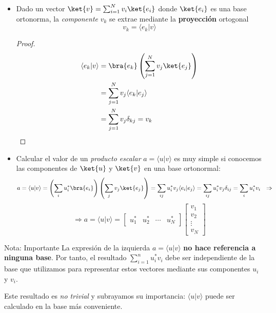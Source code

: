 \documentclass[a4paper,11pt]{book} %
\numberwithin{equation}{chapter}
\newcommand{\braket}[2]{\langle #1|#2\rangle}
\begin{document}
\begin{itemize}
	\item Dado un vector  $\ket{v} = \sum_{i=1}^N v_i \ket{e_i}$ donde $\ket{e_i}$ es una base ortonorma, la \textit{componente} $v_k$ se extrae mediante la \textbf{proyección} ortogonal
	\begin{equation}
	\boxed{v_k =\braket{e_k}{v}}
	\end{equation}

\begin{proof}
	\begin{align*}
\braket{e_k}{v} &=  \bra{e_k}\left(\sum_{j=1}^N v_j\ket{e_j}\right) \nonumber\\
                &=  \sum_{j=1}^N  v_j\braket{e_k}{e_j}  \nonumber\\
                &=  \sum_{j=1}^N  v_j\delta_{kj} = v_k
	\end{align*}
\end{proof}

	\item Calcular el valor de un \textit{producto escalar} $a=\braket{u}{v}$ es muy simple si conocemos las componentes de $\ket{u}$ y $\ket{v}$ en una base ortonormal:
	\begin{equation*}
	a = \braket{u}{v}
	 = \left(\sum_{i}u_i^*\bra{e_i}\right)\left(\sum_{j}v_j\ket{e_j} \right) 
	  = \sum_{ij} u_i^* v_j  \braket{e_i}{e_j}
	  = \sum_{ij} u_i^* v_j \delta_{ij} = \sum_{i} u_i^* v_i  ~~ \Rightarrow \\
	\end{equation*}
	\begin{equation}
	\Rightarrow \boxed{a =  \braket{u}{v} = \begin{bmatrix} {u_1^*} & {u_2^*} & \cdots & {u_N^*} 	\end{bmatrix}
	    \begin{bmatrix} {v_1}\\ {v_2}\\ \vdots \\ {v_N} \end{bmatrix}}
	\end{equation}
	
\end{itemize}

	\begin{mybox_blue}{Nota: Importante}
	La expresión de la izquierda  $a = \braket{u}{v}$ \textbf{no hace referencia a ninguna base}. Por tanto, el resultado $\sum_{i=1}^n{ u_i^* v_i} $ debe ser independiente de la base que utilizamos para representar estos vectores mediante sus componentes $u_i$ y $v_i$. 
\vspace{0.3cm}    
    
Este resultado es \textit{no trivial} y subrayamos su importancia: $\braket{u}{v}$ puede ser calculado en la base más conveniente.
	\end{mybox_blue}
\end{document}
